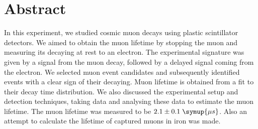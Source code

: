 \thispagestyle{plain}
\section*{Abstract}
In this experiment, we studied cosmic muon decays using plastic scintillator detectors.
We aimed to obtain the muon lifetime by stopping the muon and measuring its decaying at 
rest to an electron. The experimental signature was given by a signal from the muon decay,
followed by a delayed signal coming from the electron. We selected muon event candidates 
and subsequently identified events with a clear sign of their decaying. Muon lifetime
is obtained from a fit to their decay time distribution. We also discussed the experimental
setup and detection techniques, taking data and analysing these data to estimate the muon 
lifetime. The muon lifetime was measured to be $2.1 \pm 0.1 \; \symup{\mu s}$. Also an attempt to 
calculate the lifetime of captured muons in iron was made.
